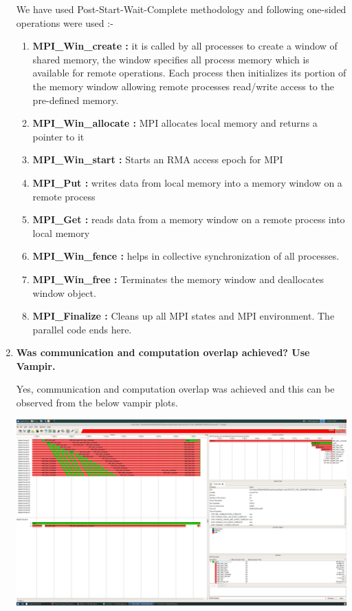 \documentclass[10pt, letterpaper, twoside]{article}
\begin{document}
\begin{titlepage}
\begin{enumerate}
We have used Post-Start-Wait-Complete methodology	and following one-sided operations were used :-
\begin{enumerate}
  \item \textbf{MPI\_Win\_create :} it is called by all processes to create a window of shared memory, the window specifies all process memory which is available for remote operations. Each process then initializes its portion of the memory window allowing remote processes read/write access to the pre-defined memory. 
  \item \textbf{MPI\_Win\_allocate :} MPI allocates local memory and returns a pointer to it
  \item \textbf{MPI\_Win\_start :} Starts an RMA access epoch for MPI
  \item \textbf{MPI\_Put :} writes data from local memory into a memory window on a remote process 
  \item \textbf{MPI\_Get :} reads data from a memory window on a remote process into local memory
  \item \textbf{MPI\_Win\_fence :} helps in collective synchronization of all processes. 
  \item \textbf{MPI\_Win\_free :} Terminates the memory window and deallocates window object.
  \item \textbf{MPI\_Finalize :} Cleans up all MPI states and MPI environment. The parallel code ends here.

\end{enumerate} 

\vspace{10mm}

	
\item\textbf{Was communication and computation overlap achieved? Use Vampir.} 

Yes, communication and computation overlap was achieved and this can be observed from the below vampir plots. 

\includegraphics[scale = 0.16]{hw_oneside_3.png}
\captionsetup{labelformat=empty}


\end{enumerate}
\end{titlepage}
\end{document}
